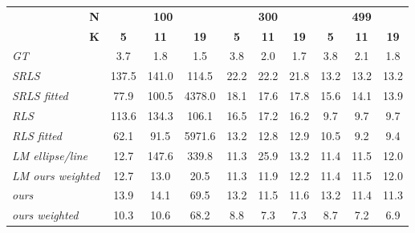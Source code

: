 \begin{tabular}{l|ccc|ccc|ccc|}
\toprule
\multicolumn{1}{r|}{\textbf{N}} & \multicolumn{3}{c|}{\textbf{100}} & \multicolumn{3}{c|}{\textbf{300}} & \multicolumn{3}{c|}{\textbf{499}} \\
\multicolumn{1}{r|}{\textbf{K}} &   \textbf{5} &   \textbf{11}&    \textbf{19}&  \textbf{5} &  \textbf{11}&  \textbf{19}&  \textbf{5} &  \textbf{11}&  \textbf{19}\\
\midrule
\textit{GT              } &   3.7 &   1.8 &    1.5 &  3.8 &  2.0 &  1.7 &  3.8 &  2.1 &  1.8 \\
\midrule \textit{SRLS            } & 137.5 & 141.0 &  114.5 & 22.2 & 22.2 & 21.8 & 13.2 & 13.2 & 13.2 \\
\textit{SRLS fitted     } &  77.9 & 100.5 & 4378.0 & 18.1 & 17.6 & 17.8 & 15.6 & 14.1 & 13.9 \\
\textit{RLS             } & 113.6 & 134.3 &  106.1 & 16.5 & 17.2 & 16.2 &  \cellcolor{\secondcolor}9.7 &  \cellcolor{\secondcolor}9.7 &  \cellcolor{\secondcolor}9.7 \\
\textit{RLS fitted      } &  62.1 &  91.5 & 5971.6 & 13.2 & 12.8 & 12.9 & 10.5 &  \cellcolor{\secondcolor}9.2 &  \cellcolor{\secondcolor}9.4 \\
\textit{LM ellipse/line } &  \cellcolor{\secondcolor}12.7 & 147.6 &  339.8 & \cellcolor{\secondcolor}11.3 & 25.9 & 13.2 & 11.4 & \cellcolor{\secondcolor}11.5 & 12.0 \\
\textit{LM ours weighted} &  \cellcolor{\secondcolor}12.7 &  \cellcolor{\secondcolor}13.0 &   \cellcolor{\firstcolor}20.5 & \cellcolor{\secondcolor}11.3 & 11.9 & 12.2 & 11.4 & \cellcolor{\secondcolor}11.5 & 12.0 \\
\textit{ours            } &  13.9 &  14.1 &   69.5 & 13.2 & \cellcolor{\secondcolor}11.5 & \cellcolor{\secondcolor}11.6 & 13.2 & 11.4 & \cellcolor{\secondcolor}11.3 \\
\textit{ours weighted   } &  \cellcolor{\firstcolor}10.3 &  \cellcolor{\firstcolor}10.6 &   \cellcolor{\secondcolor}68.2 &  \cellcolor{\firstcolor}8.8 &  \cellcolor{\firstcolor}7.3 &  \cellcolor{\firstcolor}7.3 &  \cellcolor{\firstcolor}8.7 &  \cellcolor{\firstcolor}7.2 &  \cellcolor{\firstcolor}6.9 \\
\bottomrule
\end{tabular}
